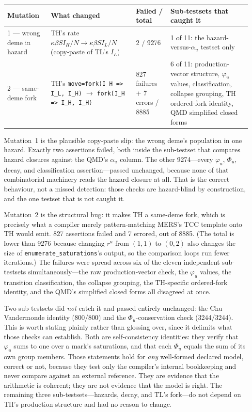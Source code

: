 \documentclass[11pt,leqno]{article}
\newcommand{\code}[1]{\texttt{#1}}
\theoremstyle{plain}
\theoremstyle{definition}
\begin{document}
\begin{center}
\renewcommand{\arraystretch}{1.3}
\begin{tabular}{p{2.1cm}p{4.0cm}p{2.4cm}p{4.6cm}}
\toprule
\textbf{Mutation} & \textbf{What changed} &
  \textbf{Failed / total} & \textbf{Sub-testsets that caught it} \\
\midrule
1 --- wrong deme in hazard &
  TH's rate $\kappa\beta S I_H/N \to \kappa\beta S I_L/N$
  (copy-paste of TL's $I_L$) &
  2 / 9276 &
  1 of 11: the hazard-versus-$\alpha_u$ testset only \\
2 --- same-deme fork &
  TH's \code{move=fork(I\_H => I\_L, I\_H)} $\to$
  \code{fork(I\_H => I\_H, I\_H)} &
  827 failures $+$ 7 errors / 8885 &
  6 of 11: production-vector structure, $\varphi_u$ values,
  classification, collapse grouping, TH ordered-fork identity,
  QMD simplified closed forms \\
\bottomrule
\end{tabular}
\end{center}

Mutation~1 is the plausible copy-paste slip: the wrong deme's population in
one hazard.  Exactly two assertions failed, both inside the sub-testset that
compares hazard closures against the QMD's $\alpha_u$ column.  The other
9274---every $\varphi_u$, $\Phi_u$, decay, and classification
assertion---passed unchanged, because none of that combinatorial machinery
reads the hazard closure at all.  That is the correct behaviour, not a
missed detection: those checks are hazard-blind by construction, and the one
testset that is not caught it.

Mutation~2 is the structural bug: it makes TH a same-deme fork, which is
precisely what a compiler merely pattern-matching MERS's TCC template onto
TH would emit.  827 assertions failed and 7 errored, out of 8885.  (The
total is lower than 9276 because changing $r^u$ from $(1,1)$ to $(0,2)$ also
changes the size of \code{enumerate\_saturations}'s output, so the
comparison loops run fewer iterations.)  The failures were spread across six
of the eleven independent sub-testsets simultaneously---the raw
production-vector check, the $\varphi_u$ values, the transition
classification, the collapse grouping, the TH-specific ordered-fork
identity, and the QMD's simplified closed forms all disagreed at once.

Two sub-testsets did \emph{not} catch it and passed entirely unchanged: the
Chu--Vandermonde identity (800/800) and the $\Phi_u$-conservation check
(3244/3244).  This is worth stating plainly rather than glossing over, since
it delimits what those checks can establish.  Both are self-consistency
identities: they verify that $\varphi_u$ sums to one over a mark's
saturations, and that each $\Phi_u$ equals the sum of its own group members.
Those statements hold for \emph{any} well-formed declared model, correct or
not, because they test only the compiler's internal bookkeeping and never
compare against an external reference.  They are evidence that the
arithmetic is coherent; they are not evidence that the model is right.  The
remaining three sub-testsets---hazards, decay, and TL's fork---do not depend
on TH's production structure and had no reason to change.
\end{document}
